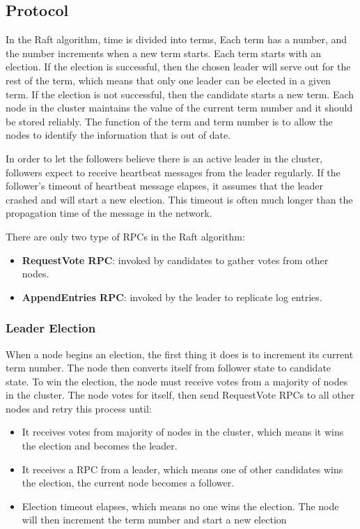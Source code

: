 \documentclass[12pt, a4paper]{article}
\begin{document}
\subsection{Protocol}
In the Raft algorithm, time is divided into terms\cite{conf/usenix/OngaroO14}, Each term has a number, and the number increments when a new term starts. Each term starts
with an election. If the election is successful, then the chosen leader will serve out for the rest of the term, which means that
only one leader can be elected in a given term. If the election is not successful, then the candidate starts a new term. Each node
in the cluster maintains the value of the current term number and it should be stored reliably. The function of the term and term number is
to allow the nodes to identify the information that is out of date.

In order to let the followers believe there is an active leader in the cluster, followers expect to receive heartbeat messages from
the leader regularly. If the follower's timeout of heartbeat message elapses, it assumes that the leader crashed and will start a
new election. This timeout is often much longer than the propagation time of the message in the network.

There are only two type of RPCs in the Raft algorithm:
\begin{itemize}
  \item \textbf{RequestVote RPC}: invoked by candidates to gather votes\cite{conf/usenix/OngaroO14} from other nodes.
  \item \textbf{AppendEntries RPC}: invoked by the leader to replicate log entries\cite{conf/usenix/OngaroO14}.
\end{itemize}

  \subsubsection{Leader Election}
  When a node begins an election, the first thing it does is to increment its current term number. The node then converts itself from
  follower state to candidate state. To win the election, the node must receive votes from a majority of nodes in the cluster. The node
  votes for itself, then send RequestVote RPCs to all other nodes and retry this process until:
  \begin{itemize}
    \item It receives votes from majority of nodes in the cluster, which means it wins the election and becomes the leader.
    \item It receives a RPC from a leader, which means one of other candidates wins the election, the current node becomes a follower.
    \item Election timeout elapses, which means no one wins the election. The node will then increment the term number and start a new election
  \end{itemize}
\end{document}
